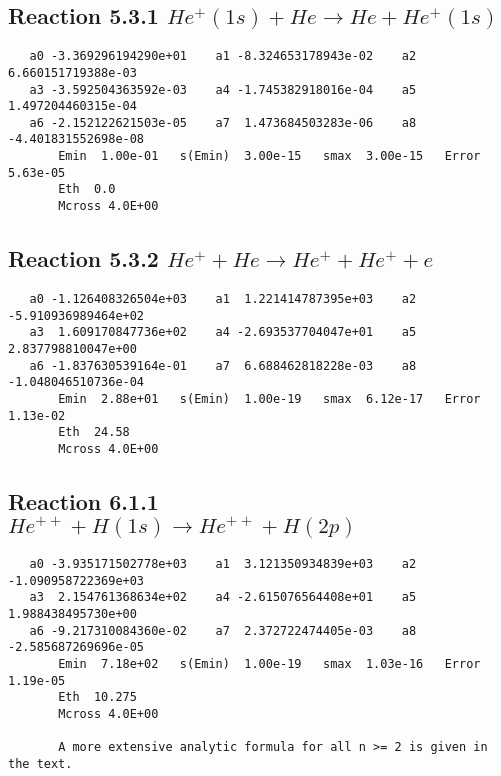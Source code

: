 \documentclass[12pt,dvipdfm]{article}
\begin{document}
\newpage
\subsection{
Reaction 5.3.1 $   He^+(1s) + He \rightarrow He + He^+(1s)$}


\begin{small}\begin{verbatim}
   a0 -3.369296194290e+01    a1 -8.324653178943e-02    a2  6.660151719388e-03
   a3 -3.592504363592e-03    a4 -1.745382918016e-04    a5  1.497204460315e-04
   a6 -2.152122621503e-05    a7  1.473684503283e-06    a8 -4.401831552698e-08
       Emin  1.00e-01   s(Emin)  3.00e-15   smax  3.00e-15   Error  5.63e-05
       Eth  0.0
       Mcross 4.0E+00
\end{verbatim}\end{small}






\newpage
\subsection{
Reaction 5.3.2 $   He^+ + He \rightarrow He^+ + He^+ + e$}


\begin{small}\begin{verbatim}
   a0 -1.126408326504e+03    a1  1.221414787395e+03    a2 -5.910936989464e+02
   a3  1.609170847736e+02    a4 -2.693537704047e+01    a5  2.837798810047e+00
   a6 -1.837630539164e-01    a7  6.688462818228e-03    a8 -1.048046510736e-04
       Emin  2.88e+01   s(Emin)  1.00e-19   smax  6.12e-17   Error  1.13e-02
       Eth  24.58
       Mcross 4.0E+00
\end{verbatim}\end{small}

\newpage
\subsection{
Reaction 6.1.1 $   He^{++} + H(1s) \rightarrow He^{++} + H(2p)$}


\begin{small}\begin{verbatim}
   a0 -3.935171502778e+03    a1  3.121350934839e+03    a2 -1.090958722369e+03
   a3  2.154761368634e+02    a4 -2.615076564408e+01    a5  1.988438495730e+00
   a6 -9.217310084360e-02    a7  2.372722474405e-03    a8 -2.585687269696e-05
       Emin  7.18e+02   s(Emin)  1.00e-19   smax  1.03e-16   Error  1.19e-05
       Eth  10.275
       Mcross 4.0E+00

       A more extensive analytic formula for all n >= 2 is given in the text.
\end{verbatim}\end{small}
\end{document}
